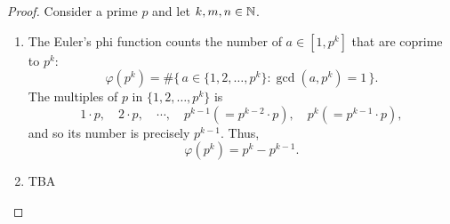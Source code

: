 \documentclass[11pt,openany]{article}
\begin{document}
\vfill
{}
\begin{proof}
	Consider a prime $p$ and let $k,m,n\in\mathbb{N}$. \begin{enumerate}[(1)]
		\item The Euler's phi function counts the number of $a\in[1,p^k]$ that are coprime to \(p^k\): \[
		\varphi(p^k)= \#\{\, a\in\{1,2,\dots, p^k\} : \gcd(a,p^k)=1\,\}.
		\]
		The multiples of \(p\) in \(\{1,2,\dots,p^k\}\) is \[
		1\cdot p,\quad 2\cdot p,\quad \cdots,\quad p^{k-1}(=p^{k-2}\cdot p),\quad p^k (=p^{k-1}\cdot p),
		\] and so its number is precisely \(p^{k-1}\). Thus, \[
		\varphi(p^k)=p^k - p^{k-1}.
		\]
		\item TBA
		
%		
%		
		
	\end{enumerate}
\end{proof}

\newpage
\end{document}
